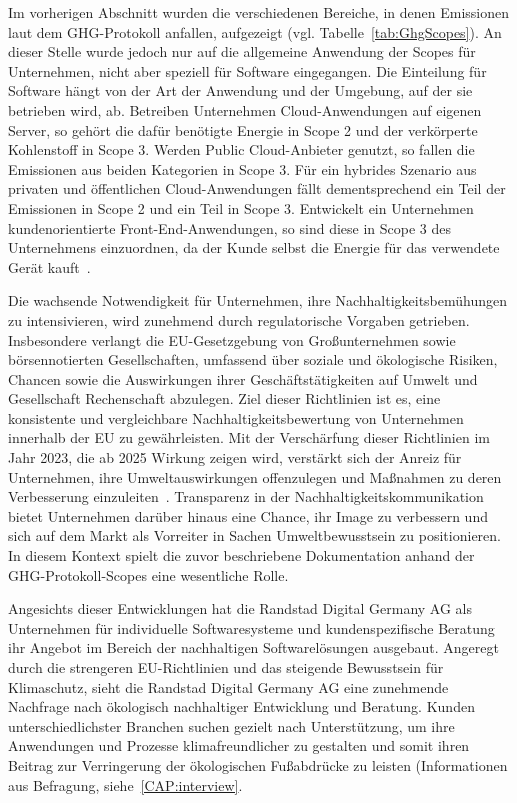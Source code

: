 Im vorherigen Abschnitt wurden die verschiedenen Bereiche, in denen Emissionen laut dem \ac{GHG}-Protokoll anfallen, aufgezeigt (vgl. Tabelle~\ref{tab:GhgScopes}).
An dieser Stelle wurde jedoch nur auf die allgemeine Anwendung der Scopes für Unternehmen, nicht aber speziell für Software eingegangen.
Die Einteilung für Software hängt von der Art der Anwendung und der Umgebung, auf der sie betrieben wird, ab.
Betreiben Unternehmen Cloud-Anwendungen auf eigenen Server, so gehört die dafür benötigte Energie in Scope 2 und der verkörperte Kohlenstoff in Scope 3.
Werden Public Cloud-Anbieter genutzt, so fallen die Emissionen aus beiden Kategorien in Scope 3.
Für ein hybrides Szenario aus privaten und öffentlichen Cloud-Anwendungen fällt dementsprechend ein Teil der Emissionen in Scope 2 und ein Teil in Scope 3.
Entwickelt ein Unternehmen kundenorientierte Front-End-Anwendungen, so sind diese in Scope 3 des Unternehmens einzuordnen, da der Kunde selbst die Energie für das verwendete Gerät kauft~\cite{GreenSoftwareFoundation.2022}.

Die wachsende Notwendigkeit für Unternehmen, ihre Nachhaltigkeitsbemühungen zu intensivieren, wird zunehmend durch regulatorische Vorgaben getrieben.
Insbesondere verlangt die EU-Gesetzgebung von Großunternehmen sowie börsennotierten Gesellschaften, umfassend über soziale und ökologische Risiken, Chancen sowie die Auswirkungen ihrer Geschäftstätigkeiten auf Umwelt und Gesellschaft Rechenschaft abzulegen.
Ziel dieser Richtlinien ist es, eine konsistente und vergleichbare Nachhaltigkeitsbewertung von Unternehmen innerhalb der EU zu gewährleisten.
Mit der Verschärfung dieser Richtlinien im Jahr 2023, die ab 2025 Wirkung zeigen wird, verstärkt sich der Anreiz für Unternehmen, ihre Umweltauswirkungen offenzulegen und Maßnahmen zu deren Verbesserung einzuleiten~\cite{DirectorateGeneralforFinancialStability.20240411T13:37:55.000Z}.
Transparenz in der Nachhaltigkeitskommunikation bietet Unternehmen darüber hinaus eine Chance, ihr Image zu verbessern und sich auf dem Markt als Vorreiter in Sachen Umweltbewusstsein zu positionieren.
In diesem Kontext spielt die zuvor beschriebene Dokumentation anhand der GHG-Protokoll-Scopes eine wesentliche Rolle.

Angesichts dieser Entwicklungen hat die Randstad Digital Germany AG als Unternehmen für individuelle Softwaresysteme und kundenspezifische Beratung ihr Angebot im Bereich der nachhaltigen Softwarelösungen ausgebaut.
Angeregt durch die strengeren EU-Richtlinien und das steigende Bewusstsein für Klimaschutz, sieht die Randstad Digital Germany AG eine zunehmende Nachfrage nach ökologisch nachhaltiger Entwicklung und Beratung.
Kunden unterschiedlichster Branchen suchen gezielt nach Unterstützung, um ihre Anwendungen und Prozesse klimafreundlicher zu gestalten und somit ihren Beitrag zur Verringerung der ökologischen Fußabdrücke zu leisten (Informationen aus Befragung, siehe~\ref{CAP:interview}.

